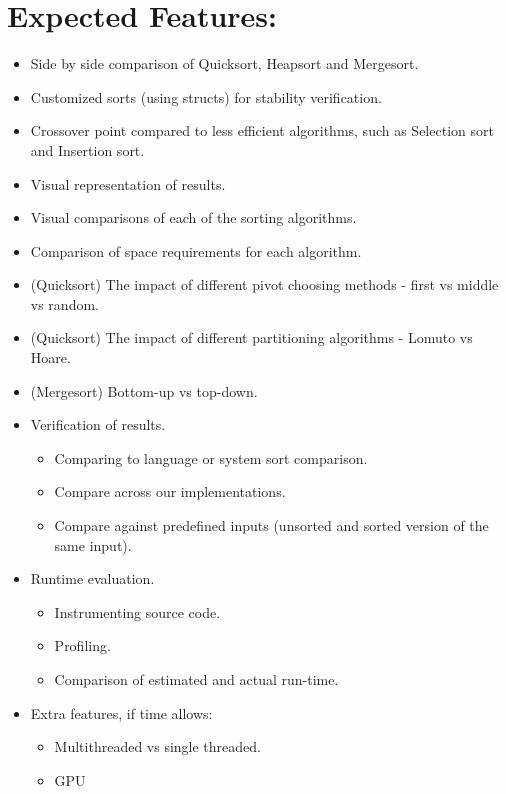 \documentclass{article}
\begin{document}
\section*{Expected Features:} 
\begin{itemize}
\item Side by side comparison of Quicksort, Heapsort and Mergesort.
\item Customized sorts (using structs) for stability verification.
\item Crossover point compared to less efficient algorithms, such as Selection sort and Insertion sort.
\item Visual representation of results.
\item Visual comparisons of each of the sorting algorithms.
\item Comparison of space requirements for each algorithm.
\item (Quicksort) The impact of different pivot choosing methods - first vs middle vs random.
\item (Quicksort) The impact of different partitioning algorithms - Lomuto vs Hoare.
\item (Mergesort) Bottom-up vs top-down.
\item Verification of results.
\begin{itemize}
\item Comparing to language or system sort comparison.
\item Compare across our implementations.
\item Compare against predefined inputs (unsorted and sorted version of the same input).
\end{itemize}
\pagebreak
\item Runtime evaluation.
\begin{itemize}
\item Instrumenting source code.
\item Profiling.
\item Comparison of estimated and actual run-time.
\end{itemize}
\item Extra features, if time allows: 
\begin{itemize}
\item Multithreaded vs single threaded.
\item GPU
\end{itemize}
\end{itemize}
\end{document}
